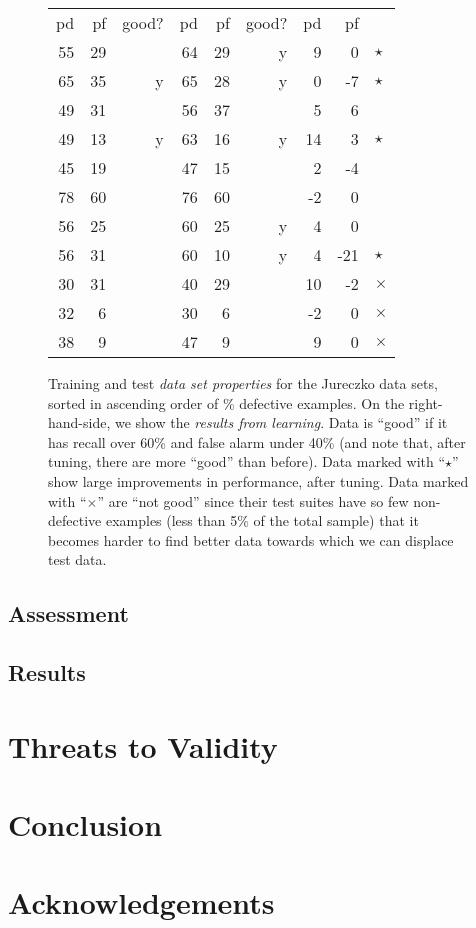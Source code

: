 \documentclass{sig-alternate}
\begin{document}
\begin{figure*}[!t]
\begin{center}
\begin{minipage}{.4\linewidth}
\begin{tabular}{|rrr|rrr|rr|l}
				pd & pf & good? & pd & pf & good? & pd & pf\\\cline{1-8}
				55 & 29 &   & 64 & 29 & y & 9 & 0&$\star$\\
				65 & 35 & y & 65 & 28 & y & 0 & -7&$\star$\\
				49 & 31 &   & 56 & 37 &   & 5 & 6\\
				49 & 13 & y & 63 & 16 & y & 14 & 3&$\star$\\
				45 & 19 &   & 47 & 15 &   & 2 & -4\\
				78 & 60 &   & 76 & 60 &   & -2 & 0\\
				56 & 25 &   & 60 & 25 & y & 4 & 0\\
				56 & 31 &   & 60 & 10 & y & 4 & -21&$\star$\\
				30 & 31 &   & 40 & 29 &   & 10 & -2&$\times$\\
				32 & 6 &   & 30 & 6 &   & -2 & 0&$\times$\\
				38 & 9 &   & 47 & 9 &   & 9 & 0&$\times$\\
				\hline 
			\end{tabular}
			
		\end{minipage}
	\end{center}    
	
	\caption{Training and test {\em data set properties} for the Jureczko data sets,
		sorted in ascending order of \% defective examples.
		On the right-hand-side, we show the {\em results from learning}.
		Data is ``good'' if it has recall over 60\% and false alarm under 40\%
		(and note that, after tuning, there are more ``good'' than before).
		Data   marked with ``$\star$'' show large improvements in performance, after tuning.
		Data   marked with ``$\times$'' are ``not good'' since their test suites  have so few non-defective examples (less than 5\% of the total sample) that it becomes harder to find better data towards which we can displace test data.
	}\label{fig:j}
\end{figure*}


\subsection{Assessment}
\subsection{Results}
\section{Threats to Validity}
\section{Conclusion}
\section*{Acknowledgements}



\end{document}

